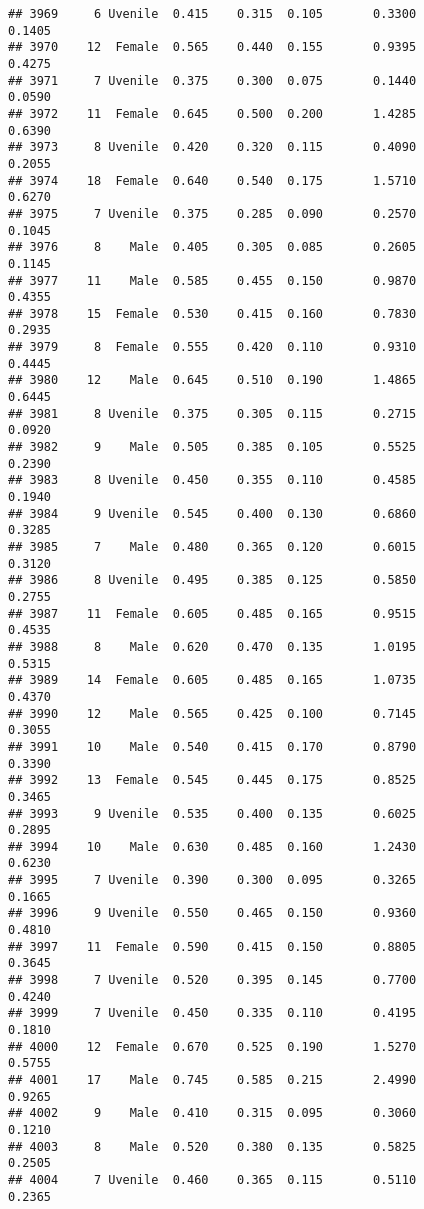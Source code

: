 \documentclass[
]{article}
\begin{document}
\begin{verbatim}
## 3969     6 Uvenile  0.415    0.315  0.105       0.3300         0.1405
## 3970    12  Female  0.565    0.440  0.155       0.9395         0.4275
## 3971     7 Uvenile  0.375    0.300  0.075       0.1440         0.0590
## 3972    11  Female  0.645    0.500  0.200       1.4285         0.6390
## 3973     8 Uvenile  0.420    0.320  0.115       0.4090         0.2055
## 3974    18  Female  0.640    0.540  0.175       1.5710         0.6270
## 3975     7 Uvenile  0.375    0.285  0.090       0.2570         0.1045
## 3976     8    Male  0.405    0.305  0.085       0.2605         0.1145
## 3977    11    Male  0.585    0.455  0.150       0.9870         0.4355
## 3978    15  Female  0.530    0.415  0.160       0.7830         0.2935
## 3979     8  Female  0.555    0.420  0.110       0.9310         0.4445
## 3980    12    Male  0.645    0.510  0.190       1.4865         0.6445
## 3981     8 Uvenile  0.375    0.305  0.115       0.2715         0.0920
## 3982     9    Male  0.505    0.385  0.105       0.5525         0.2390
## 3983     8 Uvenile  0.450    0.355  0.110       0.4585         0.1940
## 3984     9 Uvenile  0.545    0.400  0.130       0.6860         0.3285
## 3985     7    Male  0.480    0.365  0.120       0.6015         0.3120
## 3986     8 Uvenile  0.495    0.385  0.125       0.5850         0.2755
## 3987    11  Female  0.605    0.485  0.165       0.9515         0.4535
## 3988     8    Male  0.620    0.470  0.135       1.0195         0.5315
## 3989    14  Female  0.605    0.485  0.165       1.0735         0.4370
## 3990    12    Male  0.565    0.425  0.100       0.7145         0.3055
## 3991    10    Male  0.540    0.415  0.170       0.8790         0.3390
## 3992    13  Female  0.545    0.445  0.175       0.8525         0.3465
## 3993     9 Uvenile  0.535    0.400  0.135       0.6025         0.2895
## 3994    10    Male  0.630    0.485  0.160       1.2430         0.6230
## 3995     7 Uvenile  0.390    0.300  0.095       0.3265         0.1665
## 3996     9 Uvenile  0.550    0.465  0.150       0.9360         0.4810
## 3997    11  Female  0.590    0.415  0.150       0.8805         0.3645
## 3998     7 Uvenile  0.520    0.395  0.145       0.7700         0.4240
## 3999     7 Uvenile  0.450    0.335  0.110       0.4195         0.1810
## 4000    12  Female  0.670    0.525  0.190       1.5270         0.5755
## 4001    17    Male  0.745    0.585  0.215       2.4990         0.9265
## 4002     9    Male  0.410    0.315  0.095       0.3060         0.1210
## 4003     8    Male  0.520    0.380  0.135       0.5825         0.2505
## 4004     7 Uvenile  0.460    0.365  0.115       0.5110         0.2365

\end{verbatim}
\end{document}
